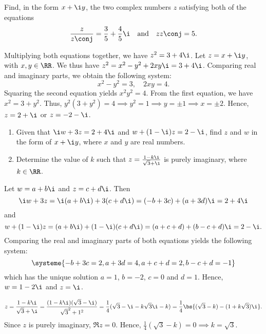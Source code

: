 \begin{problem}
    Find, in the form $x + \i y$, the two complex numbers $z$ satisfying both of the equations \[\frac{z}{z\conj} = \frac35 + \frac45 \i \quad \text{and} \quad zz\conj = 5.\]
\end{problem}
\begin{solution}
    Multiplying both equations together, we have $z^2 = 3 + 4\i$. Let $z = x + \i y$, with $x, y \in \RR$. We thus have $z^2 = x^2 - y^2 + 2xy \i = 3 + 4\i$. Comparing real and imaginary parts, we obtain the following system: \[x^2 - y^2 = 3, \quad 2xy = 4.\] Squaring the second equation yields $x^2y^2 = 4$. From the first equation, we have $x^2 = 3 + y^2$. Thus, $y^2(3 + y^2) = 4 \implies y^2 = 1 \implies y = \pm 1 \implies x = \pm 2$. Hence, $z = 2 + \i$ or $z = -2-\i$.
\end{solution}

\clearpage
\begin{problem}
    \begin{enumerate}
        \item Given that $\i w + 3z = 2 + 4\i$ and $w + (1 - \i)z = 2 - \i$, find $z$ and $w$ in the form of $x + \i y$, where $x$ and $y$ are real numbers.
        \item Determine the value of $k$ such that $z = \frac{1-k\i}{\sqrt3 + \i}$ is purely imaginary, where $k \in \RR$.
    \end{enumerate}
\end{problem}
\begin{solution}
    \begin{ppart}
        Let $w = a + b\i$ and $z = c + d\i$. Then \[\i w + 3z = \i (a + b \i) + 3(c + d\i) = (-b + 3c) + (a + 3d) \i = 2 + 4\i\] and \[w + (1 - \i) z = (a + b\i) + (1-\i)(c + d\i) = (a + c + d) + (b - c + d)\i = 2 - \i.\] Comparing the real and imaginary parts of both equations yields the following system: \[\systeme{-b+3c=2,a+3d=4,a+c+d=2,b-c+d=-1}\] which has the unique solution $a = 1$, $b = -2$, $c = 0$ and $d = 1$. Hence, $w = 1 - 2\i$ and $z = \i$.
    \end{ppart}
    \begin{ppart}
        \[z = \frac{1 - k\i}{\sqrt3 + \i} = \frac{(1-k\i)(\sqrt3 - \i)}{{\sqrt3}^2 + 1^2} = \frac14(\sqrt3 - \i - k\sqrt3 \i - k) = \frac14 \bs{(\sqrt3 - k) - (1 + k\sqrt3)\i}.\] Since $z$ is purely imaginary, $\Re{z} = 0$. Hence, $\frac14(\sqrt3 - k) = 0 \implies k = \sqrt3$.
    \end{ppart}
\end{solution}

